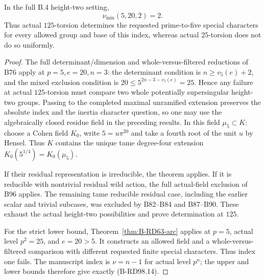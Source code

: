 \begin{corollary}
\label{cor:B-RD98-exact-five}
In the full B.4 height-two setting,
\[
                         \nu_{\min}(5,20,2)=2.
                                                        \tag{B-RD98.14}
\]
Thus actual $125$-torsion determines the requested prime-to-five
special characters for every allowed group and base of this index,
whereas actual $25$-torsion does not do so uniformly.
\end{corollary}
\begin{proof}
The full determinant/dimension and whole-versus-filtered
reductions of B76 apply at $p=5,e=20,n=3$: the determinant
condition is $n\ge v_5(e)+2$, and the mixed exclusion condition
is $20\le5^{2n-3-v_5(e)}=25$. Hence any failure at actual
$125$-torsion must compare two whole potentially supersingular
height-two groups. Passing to the completed maximal unramified
extension preserves the absolute index and the inertia character
question, so one may use the algebraically closed residue field
in the preceding results. In this field $\mu_5\subset K$: choose
a Cohen field $K_0$, write $5=u\pi^{20}$ and take a fourth
root of the unit $u$ by Hensel. Thus $K$ contains the unique
tame degree-four extension $K_0(5^{1/4})=K_0(\mu_5)$.

If their residual representation is irreducible, the theorem
applies. If it is reducible with nontrivial residual wild action,
the full actual-field exclusion of B96 applies. The remaining
tame reducible residual case, including the earlier scalar and
trivial subcases, was excluded by B82--B84 and B87--B90.
These exhaust the actual height-two possibilities and prove
determination at $125$.

For the strict lower bound, Theorem~\ref{thm:B-RD63-arc}
applies at $p=5$, actual level $p^2=25$, and $e=20>5$.
It constructs an allowed field and a whole-versus-filtered
comparison with different requested finite special characters.
Thus index one fails. The manuscript index is $\nu=n-1$
for actual level $p^n$; the upper and lower bounds therefore
give exactly (B-RD98.14).
\end{proof}

